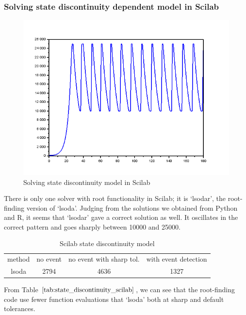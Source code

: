 \subsubsection{Solving state discontinuity dependent model in Scilab}
\begin{figure}[h]
\centering
\includegraphics[width=0.7\linewidth]{./figures/solve_state_discontinuity_scilab}
\caption{Solving state discontinuity model in Scilab}
\label{fig:solve_state_discontinuity_scilab}
\end{figure}
There is only one solver with root functionality in Scilab; it is `lsodar', the root-finding version of `lsoda'. Judging from the solutions we obtained from Python and R, it seems that `lsodar' gave a correct solution as well. It oscillates in the correct pattern and goes sharply between 10000 and 25000.

\begin{table}[h]
\caption {Scilab state discontinuity model} \label{tab:state_discontinuity_scilab}
\begin{center}
\begin{tabular}{ c c c c } 
method & no event & no event with sharp tol. & with event detection \\ 
lsoda & 2794 & 4636 & 1327 \\
\end{tabular}
\end{center}
\end{table}

From Table $\ref{tab:state_discontinuity_scilab}$, we can see that the root-finding code use fewer function evaluations that `lsoda' both at sharp and default tolerances.

